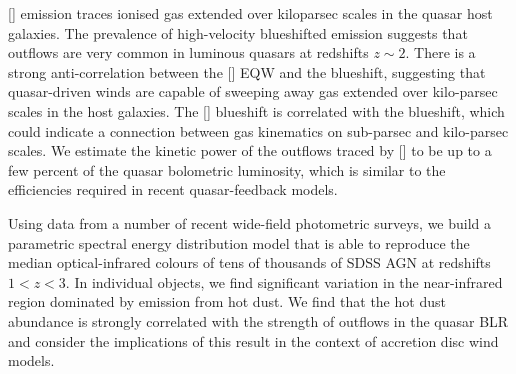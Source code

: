 [] emission traces ionised gas extended over kiloparsec scales in the quasar host galaxies. 
The prevalence of high-velocity blueshifted emission suggests that outflows are very common in luminous quasars at redshifts $z\sim2$. 
There is a strong anti-correlation between the [] EQW and the  blueshift, suggesting that quasar-driven winds are capable of sweeping away gas extended over kilo-parsec scales in the host galaxies. The [] blueshift is correlated with the  blueshift, which could indicate a connection between gas kinematics on sub-parsec and kilo-parsec scales. 
We estimate the kinetic power of the outflows traced by [] to be up to a few percent of the quasar bolometric luminosity, which is similar to the efficiencies required in recent quasar-feedback models. 

Using data from a number of recent wide-field photometric surveys, we build a parametric spectral energy distribution model that is able to reproduce the median optical-infrared colours of tens of thousands of SDSS AGN at redshifts $1 < z < 3$. 
In individual objects, we find significant variation in the near-infrared region dominated by emission from hot dust.   
We find that the hot dust abundance is strongly correlated with the strength of outflows in the quasar BLR and consider the implications of this result in the context of accretion disc wind models.


\vfill

\endgroup			

\vfill